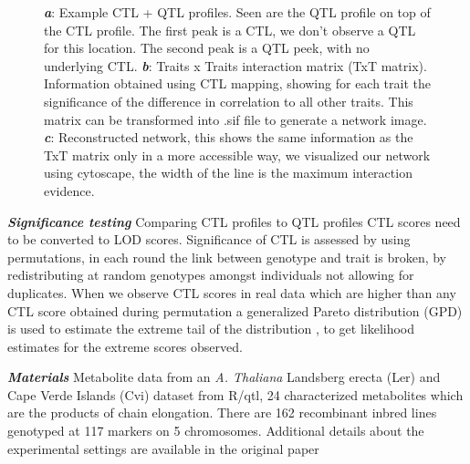 \documentclass{bioinfo}
\begin{document}
\begin{figure}[ht]
\begin{center}
{      \label{subfigc}
    }
  \end{center}
  \begin{minipage}{7in}
  \label{newplots}
  \vspace{-0.7cm}
  \caption[Plots]{
  {\emph {\bf a}}: Example CTL + QTL profiles. Seen are the QTL profile on top of the CTL profile. 
  The first peak is a CTL, we don't observe a QTL for this location. The second peak is a QTL peek, with no underlying CTL. 
  {\emph {\bf b}}: Traits x Traits interaction matrix (TxT matrix). Information obtained using CTL mapping, 
  showing for each trait the significance of the difference in correlation to all other traits. This 
  matrix can be transformed into .sif file to generate a network image. 
  {\emph {\bf c}}:  Reconstructed network, this shows the same information as the TxT matrix only in a more accessible way, we visualized our 
  network using cytoscape, the width of the line is the maximum interaction evidence.
 }
\end{minipage}
\vspace{-0.5cm}
\end{figure}

\emph{ {\bf Significance testing}}
  Comparing CTL profiles to QTL profiles CTL scores need to be converted to LOD scores. Significance 
  of CTL is assessed by using permutations, in each round the link between genotype and 
  trait is broken, by redistributing at random genotypes amongst individuals not 
  allowing for duplicates. When we observe CTL scores in real data which are higher than any 
  CTL score obtained during permutation a generalized Pareto distribution (GPD) is used to 
  estimate the extreme tail of the distribution \cite{Knijnenburg:2009}, to get likelihood estimates for the 
  extreme scores observed.

\emph{ {\bf Materials}}
  Metabolite data from an \emph{A. Thaliana} Landsberg erecta (Ler) and Cape Verde Islands (Cvi) 
  dataset from R/qtl, 24 characterized metabolites which are the products of chain elongation. 
  There are 162 recombinant inbred lines genotyped at 117 markers on 5 chromosomes. Additional 
  details about the experimental settings are available in the original paper \cite{Keurentjes:2006,AlonsoBlanco:1998}
\vspace{-0.6cm}
\end{document}
